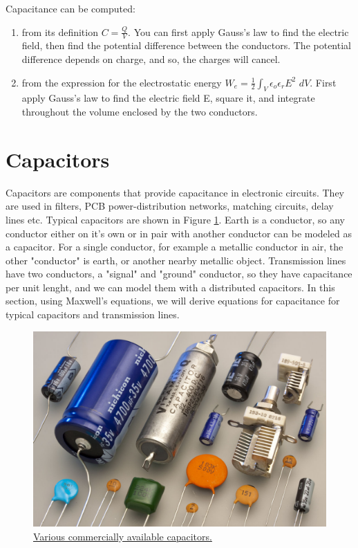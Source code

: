 \documentclass{ximera}
\begin{document}
Capacitance can be computed:

\begin{enumerate}
\item from its definition $C=\frac{Q}{V}$. You can first apply Gauss's law to find the electric field, then find the potential difference between the conductors. The potential difference depends on charge, and so, the charges will cancel.
\item from the expression for the electrostatic energy $W_e=\frac{1}{2} \int_V  \epsilon_o \epsilon_r E^2 \, \,dV$. First apply Gauss's law to find the electric field E, square it, and integrate throughout the volume enclosed by the two conductors. 
\end{enumerate}


\section{Capacitors}

Capacitors are components that provide capacitance in electronic circuits. They are used in filters, PCB power-distribution networks, matching circuits, delay lines etc. Typical capacitors are shown in Figure \ref{fig:capacitors}. Earth is a conductor, so any conductor either on it's own or in pair with another conductor can be modeled as a capacitor. For a single conductor, for example a metallic conductor in air, the other "conductor" is earth, or another nearby metallic object. Transmission lines have two conductors, a "signal" and "ground" conductor, so they have capacitance per unit lenght, and we can model them with a distributed capacitors. In this section, using Maxwell's equations, we will derive equations for capacitance for typical capacitors and transmission lines.


\begin{figure}[htbp]
\begin{center}
\includegraphics[scale=0.8]{../jpg/capacitors.jpg}
\end{center}
\caption{\href{https://en.wikipedia.org/wiki/Capacitor}{Various commercially available capacitors.}}
\label{fig:capacitors}
\end{figure}
\end{document}
